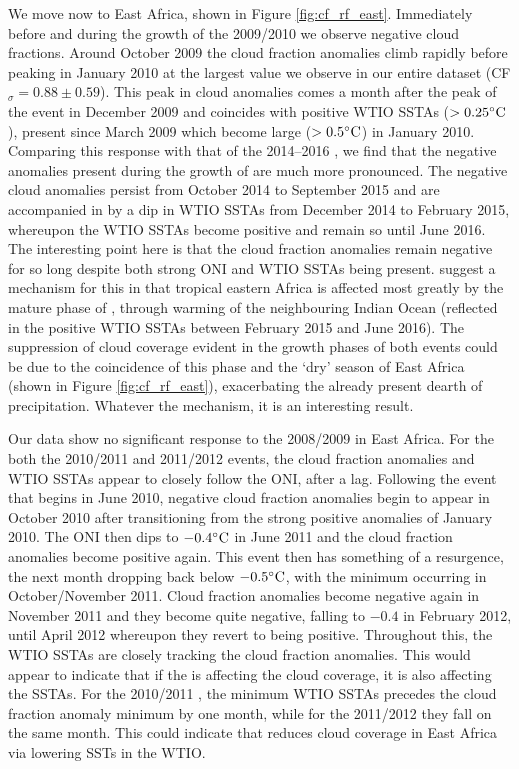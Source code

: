 We move now to East Africa, shown in Figure
\ref{fig:cf_rf_east}. Immediately before and during the growth of the
2009/2010 \elnino{} we observe negative cloud fractions. Around
October 2009 the cloud fraction anomalies climb rapidly before peaking
in January 2010 at the largest value we observe in our entire dataset
(CF$_{\sigma}=0.88\pm0.59$). This peak in cloud anomalies comes a month
after the peak of the \elnino{} event in December 2009 and coincides
with positive WTIO SSTAs ($>0.25^{\circ}\mathrm{C}$), present since March 2009
which become large ($>0.5^{\circ}\mathrm{C}$) in January 2010. Comparing this
response with that of the 2014--2016 \elnino{}, we find that the
negative anomalies present during the growth of \elnino{} are much
more pronounced. The negative cloud anomalies persist from October
2014 to September 2015 and are accompanied in by a dip in WTIO SSTAs
from December 2014 to February 2015, whereupon the WTIO SSTAs become
positive and remain so until June 2016. The interesting point here is
that the cloud fraction anomalies remain negative for so long despite
both strong ONI and WTIO SSTAs being present. \cite{parhi2016} suggest
a mechanism for this in that tropical eastern Africa is affected most
greatly by the mature phase of \elnino{}, through warming of the
neighbouring Indian Ocean (reflected in the positive WTIO SSTAs
between February 2015 and June 2016). The suppression of cloud
coverage evident in the growth phases of both \elnino{} events could be
due to the coincidence of this phase and the `dry' season of East
Africa (shown in Figure \ref{fig:cf_rf_east}), exacerbating the
already present dearth of precipitation. Whatever the mechanism, it is
an interesting result.

Our data show no significant response to the 2008/2009 \nina{} in East
Africa. For the both the 2010/2011 and 2011/2012 \nina{} events, the
cloud fraction anomalies and WTIO SSTAs appear to closely follow the
ONI, after a lag. Following the \nina event that begins in June 2010,
negative cloud fraction anomalies begin to appear in October 2010
after transitioning from the strong positive anomalies of January
2010. The ONI then dips to $-0.4^{\circ}\mathrm{C}$ in June 2011 and the cloud
fraction anomalies become positive again. This \nina{} event then has
something of a resurgence, the next month dropping back below
$-0.5^{\circ}\mathrm{C}$, with the minimum occurring in October/November
2011. Cloud fraction anomalies become negative again in November 2011
and they become quite negative, falling to $-0.4$ in February 2012,
until April 2012 whereupon they revert to being positive. Throughout
this, the WTIO SSTAs are closely tracking the cloud fraction
anomalies. This would appear to indicate that if the \nina{} is
affecting the cloud coverage, it is also affecting the SSTAs. For the
2010/2011 \nina{}, the minimum WTIO SSTAs precedes the cloud fraction
anomaly minimum by one month, while for the 2011/2012 \nina{} they
fall on the same month. This could indicate that \nina{} reduces cloud
coverage in East Africa via lowering SSTs in the WTIO.

